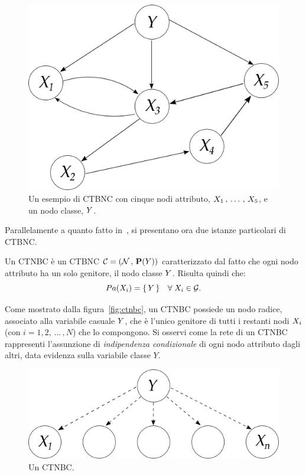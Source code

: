 \begin{figure}
\centering
\includegraphics[width=0.8\columnwidth]{immagini/ctbnc}
\caption[Un esempio di \acs{CTBNC}]{Un esempio di \acf{CTBNC} con cinque nodi attributo, $\mathnormal{X}_1\,,\,\dotsc\,,\,\mathnormal{X}_5$, e un nodo classe, $\mathnormal{Y}$.}
\label{fig:ctbnc-example}
\end{figure}

Parallelamente a quanto fatto in~\citet{Langley1992}, si presentano ora due istanze particolari di \acl{CTBNC}.

\begin{definizione}\label{defn:ctnbc}
Un \acf{CTNBC} è un \acl{CTBNC} $\mathcal{C}=(\mathcal{N}\,,\,\mathbf{P}(\mathnormal{Y}))$ caratterizzato dal fatto che ogni nodo attributo ha un solo genitore, il nodo classe $\mathnormal{Y}$. Risulta quindi che:
\[
Pa(\mathnormal{X}_i)=\{\,\mathnormal{Y}\,\} \quad \forall \; \mathnormal{X}_i \in \mathcal{G}\text{.}
\]
\end{definizione}
Come mostrato dalla figura~\vref{fig:ctnbc}, un \acs{CTNBC} possiede un nodo radice, associato alla variabile casuale $\mathnormal{Y}$, che è l'unico genitore di tutti i restanti nodi $\mathnormal{X}_i$ (con $i=1,2,\,\dotsc\,,N$) che lo compongono. Si osservi come la rete di un \acs{CTNBC} rappresenti l'assunzione di \emph{indipendenza condizionale} di ogni nodo attributo dagli altri, data evidenza sulla variabile classe $Y$.

\begin{figure}[b]
\centering
\includegraphics[width=0.9\columnwidth]{immagini/ctnb}
\caption[Un \acs{CTNBC}]{Un \acf{CTNBC}.}
\label{fig:ctnbc}
\end{figure}

